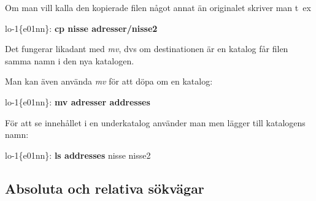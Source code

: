 \documentclass[a4paper,twocolumn]{book}
\begin{document}
Om man vill kalla den kopierade filen något annat än originalet
skriver man t~ex
\begin{example}
lo-1\{e01nn\}: \textbf{cp nisse adresser/nisse2}
\end{example} 
Det fungerar likadant med \emph{mv}, dvs om destinationen är en
katalog får filen samma namn i den nya katalogen.

Man kan även använda \emph{mv} för att döpa om en katalog:
\begin{example}
lo-1\{e01nn\}: \textbf{mv adresser addresses}
\end{example}
För att se innehållet i en underkatalog använder man  men
lägger till katalogens namn:
\begin{example}
lo-1\{e01nn\}: \textbf{ls addresses}
nisse    nisse2
\end{example}
\subsection{Absoluta och relativa sökvägar}
\end{document}
